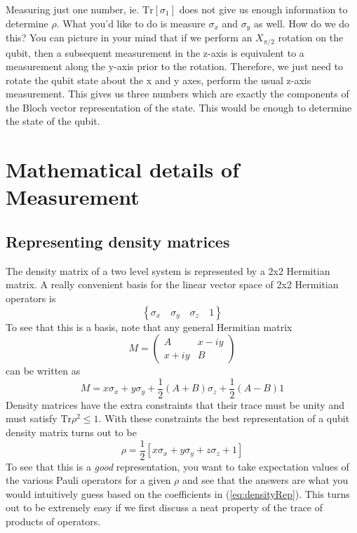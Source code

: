 \documentclass[twocolumn]{article}
\begin{document}
Measuring just one number, ie. $\textrm{Tr} [ \sigma_1 ]$ does not give us enough information to determine $\rho$. What you'd like to do is measure $\sigma_x$ and $\sigma_y$ as well. How do we do this? You can picture in your mind that if we perform an $X_{\pi/2}$ rotation on the qubit, then a subsequent measurement in the z-axis is equivalent to a measurement along the y-axis prior to the rotation. Therefore, we just need to rotate the qubit state about the x and y axes, perform the usual z-axis measurement. This gives us three numbers which are exactly the components of the Bloch vector representation of the state. This would be enough to determine the state of the qubit.

\section{Mathematical details of Measurement}

\subsection{Representing density matrices}
The density matrix of a two level system is represented by a 2x2 Hermitian matrix. A really convenient basis for the linear vector space of 2x2 Hermitian operators is \begin{equation}
\left\{  \sigma_x \quad \sigma_y \quad \sigma_z \quad 1 \right\} \label{eq:basis} \end{equation}
To see that this is a basis, note that any general Hermitian matrix \begin{displaymath}
M = \left( \begin{array}{cc} A & x-iy \\ x+iy & B \end{array} \right) \end{displaymath}
can be written as \begin{equation}
M = x\sigma_x + y\sigma_y + \frac{1}{2}(A+B)\sigma_z + \frac{1}{2}(A-B)1 \end{equation}
Density matrices have the extra constraints that their trace must be unity and must satisfy $\textrm{Tr}\rho^2 \le 1$. With these constraints the best representation of a qubit density matrix turns out to be \begin{equation}
\rho = \frac{1}{2} \left[ x\sigma_x + y\sigma_y + z\sigma_z + 1 \right] \label{eq:densityRep} \end{equation}
To see that this is a \emph{good} representation, you want to take expectation values of the various Pauli operators for a given $\rho$ and see that the answers are what you would intuitively guess based on the coefficients in (\ref{eq:densityRep}). This turns out to be extremely easy if we first discuss a neat property of the trace of products of operators.
\end{document}
